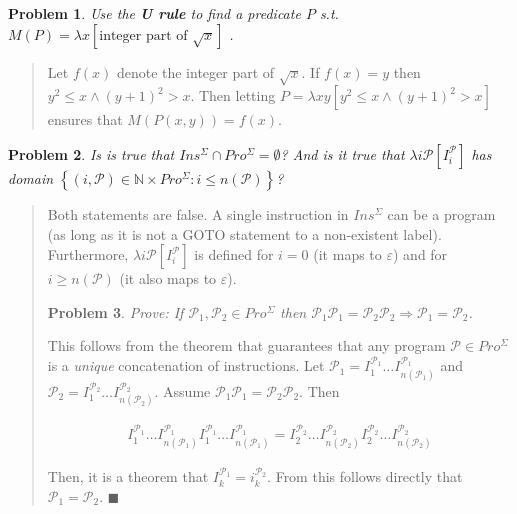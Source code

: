 \documentclass[a4paper, 12pt]{article}
\newtheorem{problem}{Problem}
\newtheorem{problem}{Problem}
\begin{document}
\begin{problem}
    Use the \textbf{U rule} to find a predicate $P$ s.t. $M(P) = \lambda
    x[\text{integer part of } \sqrt{x}]$ .
\end{problem}


\small
\begin{quote}

Let $f(x)$ denote the integer part of $\sqrt{x}$. If $f(x) = y$ then $y^2 \leq x
\land (y+1)^2 > x$. Then letting $P = \lambda xy\left[ y^2 \leq x \land (y +
1)^2 > x \right] $ ensures that $M(P(x, y)) = f(x)$.


\end{quote}
\normalsize


\begin{problem}
    Is is true that $Ins^{\Sigma} \cap Pro^{\Sigma} = \emptyset$? And is it true
    that $\lambda i \mathcal{P} [I_i^{\mathcal{P}}]$ has domain $\left\{ (i,
    \mathcal{P}) \in \mathbb{N} \times Pro^{\Sigma}: i \leq n(\mathcal{P})
\right\} $?
\end{problem}


\small
\begin{quote}

Both statements are false. A single instruction in $Ins^{\Sigma}$ can be a
program (as long as it is not a GOTO statement to a non-existent label).
Furthermore, $\lambda i \mathcal{P} [I_i^{\mathcal{P}}]$ is defined for $i = 0$
(it maps to $\varepsilon$) and for $i \geq n(\mathcal{P} )$ (it also maps to
$\varepsilon$).

\begin{problem}
    Prove: If $\mathcal{P}_1, \mathcal{P}_2 \in Pro^{\Sigma}$ then $\mathcal{P}_1
    \mathcal{P}_1 = \mathcal{P}_2 \mathcal{P}_2 \Rightarrow \mathcal{P}_1 =
    \mathcal{P}_2$.
\end{problem}

This follows from the theorem that guarantees that any program $\mathcal{P} \in
Pro^{\Sigma}$ is a \textit{unique} concatenation of instructions. Let
$\mathcal{P}_1 = I_1^{\mathcal{P}_1} \ldots I_{n(\mathcal{P}_1)}^{\mathcal{P}_1}$ and $\mathcal{P}_2 = I_1^{\mathcal{P}_2}
\ldots I_{n(\mathcal{P}_2)}^{\mathcal{P}_2}$. Assume $\mathcal{P}_1\mathcal{P}_1 =
\mathcal{P}_2 \mathcal{P}_2$. Then 

\begin{align*}
    I_1^{\mathcal{P}_1} \ldots I_{n(\mathcal{P}_1)}^{\mathcal{P}_1}
    I_1^{\mathcal{P}_1} \ldots I_{n(\mathcal{P}_1)}^{\mathcal{P}_1} = 
    I_2^{\mathcal{P}_2} \ldots I_{n(\mathcal{P}_2)}^{\mathcal{P}_2}
    I_2^{\mathcal{P}_2} \ldots I_{n(\mathcal{P}_2)}^{\mathcal{P}_2}
\end{align*}

Then, it is a theorem that $I_k^{\mathcal{P}_1} =
i_k^{\mathcal{P}_2}$. From this follows directly that $\mathcal{P}_1 =
\mathcal{P}_2$. $\blacksquare$

\end{quote}
\normalsize
\end{document}
